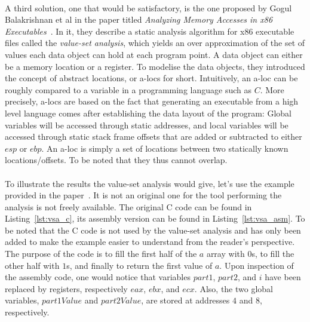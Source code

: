 \paragraph{}
A third solution, one that would be satisfactory, is the one proposed by Gogul Balakrishnan et al in the paper titled \textit{Analyzing Memory Accesses in x86 Executables}~\cite{balakrishnan2004analyzing}. In it, they describe a static analysis algorithm for x86 executable files called the \textit{value-set analysis}, which yields an over approximation of the set of values each data object can hold at each program point. A data object can either be a memory location or a register. To modelise the data objects, they introduced the concept of abstract locations, or a-locs for short. Intuitively, an a-loc can be roughly compared to a variable in a programming language such as $C$. More precisely, a-locs are based on the fact that generating an executable from a high level language comes after establishing the data layout of the program: Global variables will be accessed through static addresses, and local variables will be accessed through static stack frame offsets that are added or subtracted to either $esp$ or $ebp$. An a-loc is simply a set of locations between two statically known locations/offsets. To be noted that they thus cannot overlap.

\paragraph{}
To illustrate the results the value-set analysis would give, let's use the example provided in the paper~\cite{balakrishnan2004analyzing}. It is not an original one for the tool performing the analysis is not freely available. The original C code can be found in Listing~\ref{lst:vsa_c}, its assembly version can be found in Listing~\ref{lst:vsa_asm}. To be noted that the C code is not used by the value-set analysis and has only been added to make the example easier to understand from the reader's perspective. The purpose of the code is to fill the first half of the $a$ array with $0$s, to fill the other half with $1$s, and finally to return the first value of $a$. Upon inspection of the assembly code, one would notice that variables $part1$, $part2$, and $i$ have been replaced by registers, respectively $eax$, $ebx$, and $ecx$. Also, the two global variables, $part1Value$ and $part2Value$, are stored at addresses $4$ and $8$, respectively. \\ \\


